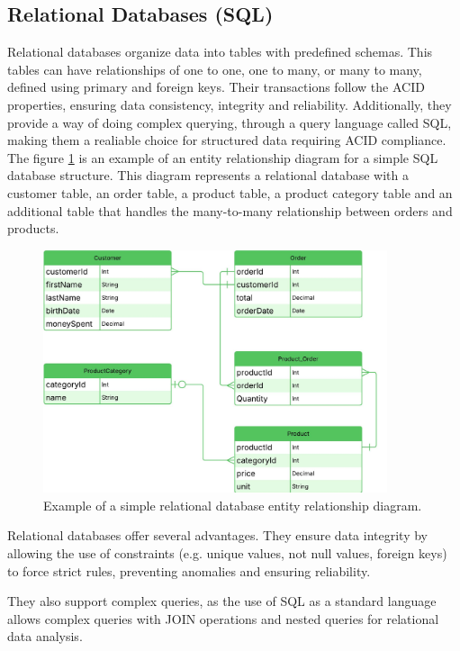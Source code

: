 \subsection{Relational Databases (SQL)}
Relational databases organize data into tables with predefined schemas.
This tables can have relationships of one to one, one to many, or many to many,
defined using primary and foreign keys. Their transactions follow the \gls{ACID}
properties, ensuring data
consistency, integrity and reliability. Additionally, they provide a way of
doing complex querying, through a query language called \gls{SQL}, making them
a realiable choice for structured data requiring \gls{ACID} compliance\cite{bdcc7020097, Yadav2024}.
The figure \ref{fig:databases:sql}
is an example of an entity relationship diagram for a simple \gls{SQL} database structure.
This diagram represents a relational database with a customer table, an order table, a product table, a product
category table and an additional table that handles the many-to-many
relationship between orders and products.

\begin{figure}[H]
	\centering
	\includegraphics[width=0.9\textwidth, height=0.5\textheight, keepaspectratio]{Chapters/Figures/Databases/SQL.pdf}
	\caption{Example of a simple relational database entity relationship diagram. }
	\label{fig:databases:sql}
\end{figure}

Relational databases offer several advantages.
They ensure data integrity by allowing the use of constraints (e.g. unique values, not null values,
foreign keys) to force strict rules, preventing anomalies and ensuring
reliability\cite{bdcc7020097}.

They also support complex queries, as the use of \gls{SQL} as a standard
language allows complex queries with JOIN operations and nested queries for relational data analysis.

